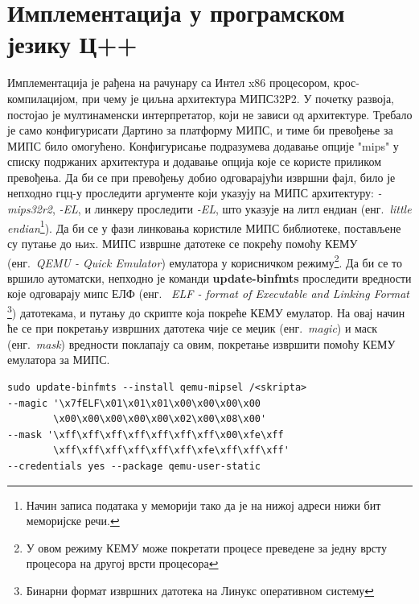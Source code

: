 \documentclass[12pt,oneside]{memoir}
\begin{document}
\section{Имплементација у програмском језику Ц++}
Имплементација је рађена на рачунару са Интел x86 процесором, крос-компилацијом, при чему је циљна архитектура  МИПС32Р2. У почетку развоја, постојао је мултинаменски интерпретатор, који не зависи од архитектуре. Требало је само конфигурисати Дартино за платформу МИПС, и тиме би превођење за МИПС било омогућено. Конфигурисање подразумева додавање опције "mips" у списку подржаних архитектура и додавање опција које се користе приликом превођења. Да би се при превођењу добио одговарајући извршни фајл, било је непходно гцц-у проследити аргументе који указују на МИПС архитектуру: \textit{-mips32r2}, \textit{-EL}, и линкеру проследити \textit{-EL}, што указује на литл ендиан (енг.~\textit{little endian}\footnote{Начин записа података у меморији тако да је на нижој адреси нижи бит меморијске речи.}). Да би се у фази линковања користиле МИПС библиотеке, постављене су путање до њиx. 
МИПС извршне датотеке се покрећу помоћу КЕМУ (енг.~\textit{QEMU - Quick Emulator}) емулатора у корисничком режиму\footnote{У овом режиму КЕМУ може покретати процесе преведене за једну врсту процесора на другој врсти процесора}. Да би се то вршило аутоматски, непходно је команди \textbf{update-binfmts} проследити вредности које одговарају мипс ЕЛФ (енг.~\textit{ ELF - format of Executable and Linking Format} \footnote{Бинарни формат извршних датотека на Линукс оперативном систему}) датотекама, и путању до скрипте која покреће КЕМУ емулатор. На овај начин ће се при покретању извршних датотека чије се меџик (енг.~\textit{magic}) и маск (енг.~\textit{mask}) вредности поклапају са овим, покретање извршити помоћу КЕМУ емулатора за МИПС.\\

\begin{verbatim}
sudo update-binfmts --install qemu-mipsel /<skripta>
--magic '\x7fELF\x01\x01\x01\x00\x00\x00\x00
        \x00\x00\x00\x00\x00\x02\x00\x08\x00'
--mask '\xff\xff\xff\xff\xff\xff\xff\x00\xfe\xff
        \xff\xff\xff\xff\xff\xff\xfe\xff\xff\xff'
--credentials yes --package qemu-user-static
\end{verbatim}
\end{document}
